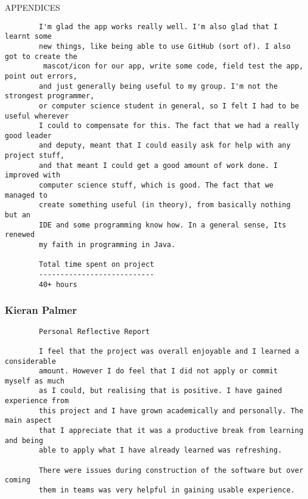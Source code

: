 \documentclass{article}
\begin{document}
\begin{section}{APPENDICES}
\begin{verbatim}
		I'm glad the app works really well. I'm also glad that I learnt some 
		new things, like being able to use GitHub (sort of). I also got to create the
		 mascot/icon for our app, write some code, field test the app, point out errors,
		and just generally being useful to my group. I'm not the strongest programmer, 
		or computer science student in general, so I felt I had to be useful wherever 
		I could to compensate for this. The fact that we had a really good leader 
		and deputy,	meant that I could easily ask for help with any project stuff, 
		and that meant I could get a good amount of work done. I improved with 
		computer science stuff, which is good. The fact that we managed to 
		create something useful (in theory), from basically nothing but an 
		IDE and some programming know how. In a general sense, Its renewed 
		my faith in programming in Java. 
		
		Total time spent on project
		---------------------------
		40+ hours
		\end{verbatim}
		
		\clearpage
		\subsubsection{Kieran Palmer}
		\begin{verbatim}
		Personal Reflective Report

		I feel that the project was overall enjoyable and I learned a considerable
		amount. However I do feel that I did not apply or commit myself as much 
		as I could, but realising that is positive. I have gained experience from
		this project and I have grown academically and personally. The main aspect 
		that I appreciate that it was a productive break from learning and being 
		able to apply what I have already learned was refreshing.

		There were issues during construction of the software but over coming 
		them in teams was very helpful in gaining usable experience.
		\end{verbatim}
		
		
		
		
	
		
		
		
	\end{section}
\end{document}
